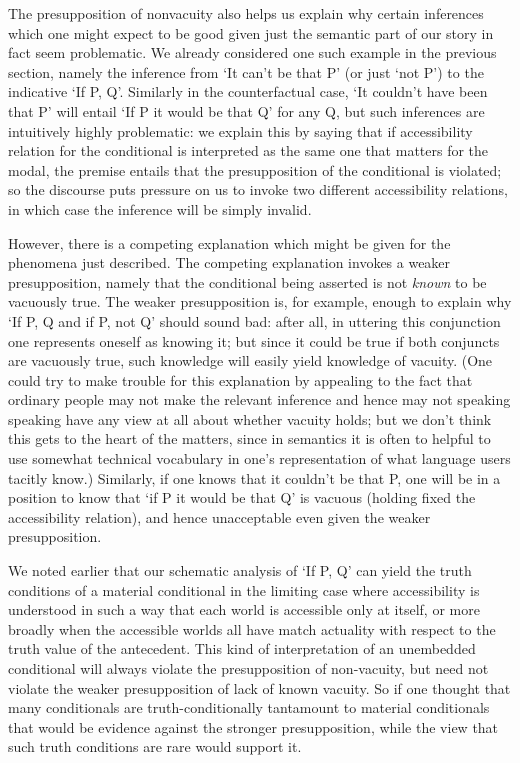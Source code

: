 The presupposition of nonvacuity also helps us explain why certain
inferences which one might expect to be good given just the semantic
part of our story in fact seem problematic. We already considered one
such example in the previous section, namely the inference from `It
can't be that P' (or just `not P') to the indicative `If P, Q'.
Similarly in the counterfactual case, `It couldn't have been that P'
will entail `If P it would be that Q' for any Q, but such inferences are
intuitively highly problematic: we explain this by saying that if
accessibility relation for the conditional is interpreted as the same
one that matters for the modal, the premise entails that the
presupposition of the conditional is violated; so the discourse puts
pressure on us to invoke two different accessibility relations, in which
case the inference will be simply invalid.

However, there is a competing explanation which might be given for the
phenomena just described. The competing explanation invokes a weaker
presupposition, namely that the conditional being asserted is not
\emph{known} to be vacuously true. The weaker presupposition is, for
example, enough to explain why `If P, Q and if P, not Q' should sound
bad: after all, in uttering this conjunction one represents oneself as
knowing it; but since it could be true if both conjuncts are vacuously
true, such knowledge will easily yield knowledge of vacuity. (One could
try to make trouble for this explanation by appealing to the fact that
ordinary people may not make the relevant inference and hence may not
speaking speaking have any view at all about whether vacuity holds; but
we don't think this gets to the heart of the matters, since in semantics
it is often to helpful to use somewhat technical vocabulary in one's
representation of what language users tacitly know.) Similarly, if one
knows that it couldn't be that P, one will be in a position to know that
`if P it would be that Q' is vacuous (holding fixed the accessibility
relation), and hence unacceptable even given the weaker presupposition.

We noted earlier that our schematic analysis of `If P, Q' can yield the
truth conditions of a material conditional in the limiting case where
accessibility is understood in such a way that each world is accessible
only at itself, or more broadly when the accessible worlds all have
match actuality with respect to the truth value of the antecedent. This
kind of interpretation of an unembedded conditional will always violate
the presupposition of non-vacuity, but need not violate the weaker
presupposition of lack of known vacuity. So if one thought that many
conditionals are truth-conditionally tantamount to material conditionals
that would be evidence against the stronger presupposition, while the
view that such truth conditions are rare would support it.

